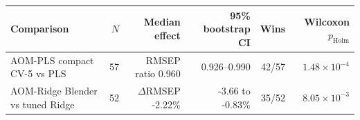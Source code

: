 \begin{tabularx}{\linewidth}{Xrrrrr}
\toprule
Comparison & $N$ & Median effect & 95\% bootstrap CI & Wins & Wilcoxon $p_{\mathrm{Holm}}$ \\
\midrule
AOM-PLS compact CV-5 vs PLS & 57 & RMSEP ratio 0.960 & 0.926--0.990 & 42/57 & $1.48\times 10^{-4}$ \\
AOM-Ridge Blender vs tuned Ridge & 52 & $\Delta$RMSEP -2.22\% & -3.66 to -0.83\% & 35/52 & $8.05\times 10^{-3}$ \\
\bottomrule
\end{tabularx}
